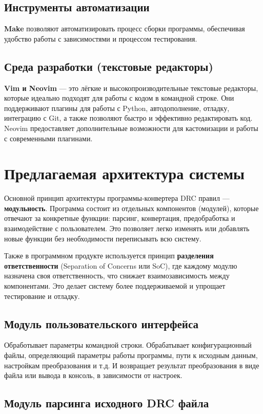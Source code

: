 \subsection{Инструменты автоматизации}
\textbf{Make} позволяют автоматизировать процесс сборки программы,
обеспечивая удобство работы с зависимостями и процессом тестирования.

\subsection{Среда разработки (текстовые редакторы)}
\textbf{Vim и Neovim} --- это лёгкие
и высокопроизводительные текстовые редакторы,
которые идеально подходят для работы с кодом в командной строке.
Они поддерживают плагины для работы с Python, автодополнение, отладку,
интеграцию с Git, а также позволяют быстро
и эффективно редактировать код.
Neovim предоставляет дополнительные возможности
для кастомизации и работы с современными плагинами.

\section{Предлагаемая архитектура системы}

Основной принцип архитектуры программы-конвертера DRC правил
--- \textbf{модульность}.
Программа состоит из отдельных компонентов (модулей),
которые отвечают за конкретные функции:
парсинг, конвертация, предобработка и взаимодействие с пользователем.
Это позволяет легко изменять или добавлять новые функции
без необходимости переписывать всю систему.\par
Также в программном продукте используется принцип
\textbf{разделения ответственности} 
(Separation of Concerns или SoC), где каждому модулю назначена
своя ответственность, что снижает взаимозависимость между компонентами.
Это делает систему более поддерживаемой и упрощает тестирование и отладку.

\subsection{Модуль пользовательского интерфейса}

Обработывает параметры командной строки.
Обрабатывает конфигурационный файлы,
определяющий параметры работы программы,
пути к исходным данным, настройкам преобразования и т.д.
И возвращает результат преобразования в виде файла или вывода в консоль,
в зависимости от настроек.

\subsection{Модуль парсинга исходного DRC файла}

